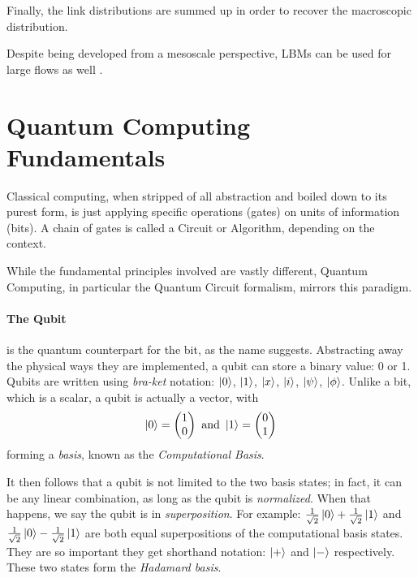 Finally, the link distributions are summed up in order to recover the macroscopic distribution.


Despite being developed from a mesoscale perspective, LBMs can be used for large flows as well \cite{sharma2020current}.

\section{Quantum Computing Fundamentals}
\label{sec:qc-basics}

Classical computing, when stripped of all abstraction and boiled down to its purest form, is just applying specific operations (gates) on units of information (bits).
A chain of gates is called a Circuit or Algorithm, depending on the context.

While the fundamental principles involved are vastly different, Quantum Computing, in particular the Quantum Circuit formalism, mirrors this paradigm.

\paragraph*{The Qubit}
is the quantum counterpart for the bit, as the name suggests. Abstracting away the physical ways they are implemented, a qubit can store a binary value: 0 or 1.
Qubits are written using \emph{bra-ket} notation: $\ket{0}$, $\ket{1}$, $\ket{x}$, $\ket{i}$, $\ket{\psi}$, $\ket{\phi}$.
Unlike a bit, which is a scalar, a qubit is actually a vector, with
\begin{equation*}
  \ket{0} = \begin{pmatrix} 1 \\ 0 \end{pmatrix} \text{ and } \ket{1} = \begin{pmatrix} 0 \\ 1 \end{pmatrix}
\end{equation*}
forming a \emph{basis}, known as the \emph{Computational Basis}.

It then follows that a qubit is not limited to the two basis states; in fact, it can be any linear combination, as long as the qubit is \emph{normalized}.
When that happens, we say the qubit is in \emph{superposition}.
For example: $\frac{1}{\sqrt2}\ket{0} + \frac{1}{\sqrt2}\ket{1}$ and $\frac{1}{\sqrt2}\ket{0} - \frac{1}{\sqrt2}\ket{1}$ are both equal superpositions of the computational basis states.
They are so important they get shorthand notation: $\ket{+}$ and $\ket{-}$ respectively. These two states form the \emph{Hadamard basis}.

